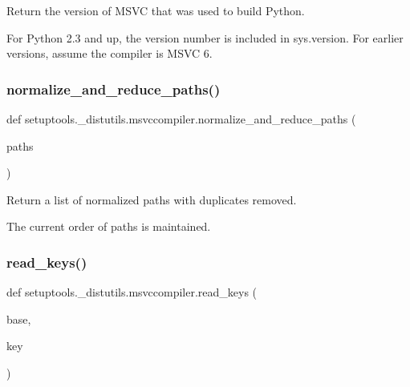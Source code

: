 \begin{DoxyVerb}Return the version of MSVC that was used to build Python.

For Python 2.3 and up, the version number is included in
sys.version.  For earlier versions, assume the compiler is MSVC 6.
\end{DoxyVerb}
 \mbox{\label{namespacesetuptools_1_1__distutils_1_1msvccompiler_a5844eddc8cf5e6dde2a82f28c6f88e2a}} 
\subsubsection{\texorpdfstring{normalize\+\_\+and\+\_\+reduce\+\_\+paths()}{normalize\_and\_reduce\_paths()}}
{\footnotesize\ttfamily def setuptools.\+\_\+distutils.\+msvccompiler.\+normalize\+\_\+and\+\_\+reduce\+\_\+paths (\begin{DoxyParamCaption}\item[{}]{paths }\end{DoxyParamCaption})}

\begin{DoxyVerb}Return a list of normalized paths with duplicates removed.

The current order of paths is maintained.
\end{DoxyVerb}
 \mbox{\label{namespacesetuptools_1_1__distutils_1_1msvccompiler_a1d87ae271ef1707ccc90db95c812e128}} 
\subsubsection{\texorpdfstring{read\+\_\+keys()}{read\_keys()}}
{\footnotesize\ttfamily def setuptools.\+\_\+distutils.\+msvccompiler.\+read\+\_\+keys (\begin{DoxyParamCaption}\item[{}]{base,  }\item[{}]{key }\end{DoxyParamCaption})}


